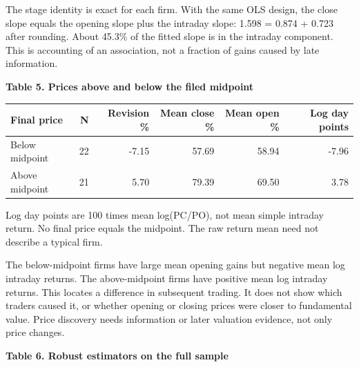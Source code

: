 \documentclass[10pt,a4paper]{article}
\begin{document}
The stage identity is exact for each firm. With the same OLS design, the close slope equals the opening slope plus the intraday slope: 1.598 = 0.874 + 0.723 after rounding. About 45.3\% of the fitted slope is in the intraday component. This is accounting of an association, not a fraction of gains caused by late information.

\par\addvspace{5pt}\textbf{Table 5. Prices above and below the filed midpoint}\par\nobreak\vspace{2pt}

{\small\renewcommand{\arraystretch}{1.10}\begin{tabularx}{\textwidth}{@{}Xrrrrr@{}}\toprule

\textbf{Final price} & \textbf{N} & \textbf{Revision \%} & \textbf{Mean close \%} & \textbf{Mean open \%} & \textbf{Log day points} \\\midrule

Below midpoint & 22 & -7.15 & 57.69 & 58.94 & -7.96 \\

Above midpoint & 21 & 5.70 & 79.39 & 69.50 & 3.78 \\

\bottomrule\end{tabularx}}\par

{\footnotesize Log day points are 100 times mean log(PC/PO), not mean simple intraday return. No final price equals the midpoint. The raw return mean need not describe a typical firm.}\par

The below-midpoint firms have large mean opening gains but negative mean log intraday returns. The above-midpoint firms have positive mean log intraday returns. This locates a difference in subsequent trading. It does not show which traders caused it, or whether opening or closing prices were closer to fundamental value. Price discovery needs information or later valuation evidence, not only price changes.

\par\addvspace{5pt}\textbf{Table 6. Robust estimators on the full sample}\par\nobreak\vspace{2pt}
\end{document}

